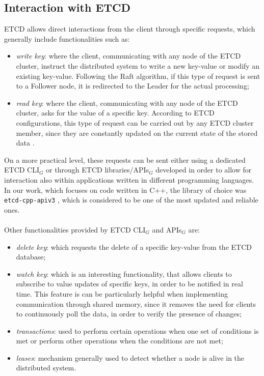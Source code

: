 \subsection{Interaction with ETCD}\label{ETCD-interaction}
ETCD allows direct interactions from the client through specific requests, which generally include functionalities \cite{site:etcd-doc} such as:
\begin{itemize}
	\item \textit{write key}: where the client, communicating with any node of the ETCD cluster, instruct the distributed system to write a new key-value or modify an existing key-value. Following the Raft algorithm, if this type of request is sent to a Follower node, it is redirected to the Leader for the actual processing;
	\item \textit{read key}: where the client, communicating with any node of the ETCD cluster, asks for the value of a specific key. According to ETCD configurations, this type of request can be carried out by any ETCD cluster member, since they are constantly updated on the current state of the stored data \cite{site:etcd-faq}.
\end{itemize}
On a more practical level, these requests can be sent either using a dedicated ETCD CLI$_G$ or through ETCD libraries/APIs$_G$ developed in order to allow for interaction also within applications written in different programming languages. In our work, which focuses on code written in C++, the library of choice was \texttt{etcd-cpp-apiv3} \cite{site:etcd-cpp-apiv3}, which is considered to be one of the most updated and reliable ones. \\ \\
Other functionalities \cite{site:etcd-doc} provided by ETCD CLI$_G$ and APIs$_G$ are:
\begin{itemize}
	\item \textit{delete key}: which requests the delete of a specific key-value from the ETCD database;
	\item \textit{watch key}: which is an interesting functionality, that allows clients to subscribe to value updates of specific keys, in order to be notified in real time. This feature is can be particularly helpful when implementing communication through shared memory, since it removes the need for clients to continuously poll the data, in order to verify the presence of changes;
	\item \textit{transactions}: used to perform certain operations when one set of conditions is met or perform other operations when the conditions are not met;
	\item \textit{leases}: mechanism generally used to detect whether a node is alive in the distributed system.
\end{itemize}
